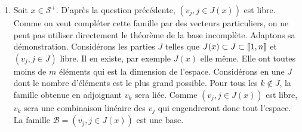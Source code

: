 \begin{enumerate}
  \item Soit $x \in \mathcal{S}^+$. D'après la question précédente, $\left(v_j, j\in J(x)\right)$ est libre. Comme on veut compléter cette famille par des vecteurs particuliers, on ne peut pas utiliser directement le théorème de la base incomplète. Adaptons sa démonstration.\newline
Considérons les parties $J$ telles que $J(x) \subset J \subset \llbracket 1,n\rrbracket$ et $\left(v_j, j\in J\right)$ libre. Il en existe, par exemple $J(x)$ elle même. Elle ont toutes moins de $m$ éléments qui est la dimension de l'espace. Considérons en une $J$ dont le nombre d'éléments est le plus grand possible.\newline
Pour tous les $k \notin J$, la famille obtenue en adjoignant $v_k$ sera liée. Comme $\left(v_j, j\in J(x)\right)$ est libre, $v_k$ sera une combinaison linéaire des $v_j$ qui engendreront donc tout l'espace. La famille $\mathcal{B} = \left(v_j, j\in J(x)\right)$ est une base.
\end{enumerate}
\newpage

